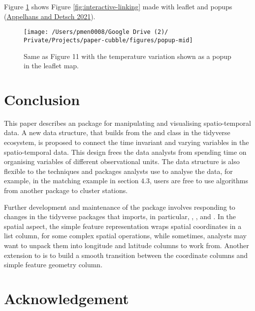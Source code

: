 \documentclass{article}
\begin{document}
Figure \ref{fig:interactive-popup} shows Figure \ref{fig:interactive-linking} made with leaflet and popups (\protect\hyperlink{ref-leafpop}{Appelhans and Detsch 2021}).

\begin{figure}

{\centering \texttt{[image: /Users/pmen0008/Google Drive (2)/ Private/Projects/paper-cubble/figures/popup-mid]} 

}

\caption{Same as Figure 11 with the temperature variation shown as a popup in the leaflet map.}\label{fig:interactive-popup}
\end{figure}

\hypertarget{conclude}{%
\section{Conclusion}\label{conclude}}

This paper describes an  package  for manipulating and visualising spatio-temporal data. A new data structure,  that builds from the  and  class in the tidyverse ecosystem, is proposed to connect the time invariant and varying variables in the spatio-temporal data. This design frees the data analysts from spending time on organising variables of different observational units. The data structure is also flexible to the techniques and packages analysts use to analyse the data, for example, in the matching example in section 4.3, users are free to use algorithms from another package to cluster stations.

Further development and maintenance of the package involves responding to changes in the tidyverse packages that  imports, in particular, , , and . In the spatial aspect, the simple feature representation wraps spatial coordinates in a list column, for some complex spatial operations, while sometimes, analysts may want to unpack them into longitude and latitude columns to work from. Another extension to  is to build a smooth transition between the coordinate columns and simple feature geometry column.

\newpage

\hypertarget{acknowledgement}{%
\section{Acknowledgement}\label{acknowledgement}}
\end{document}
